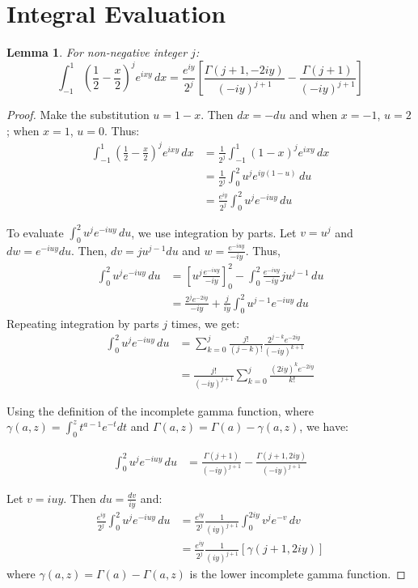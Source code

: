 \documentclass[12pt]{article}
\newtheorem{lemma}[theorem]{Lemma}
\begin{document}
\section*{Integral Evaluation}

\begin{lemma}
For non-negative integer $j$:
\[
\int_{-1}^1 \left(\frac{1}{2} - \frac{x}{2}\right)^j e^{ixy} \, dx = 
\frac{e^{iy}}{2^j} \left[\frac{\Gamma(j+1,-2iy)}{(-iy)^{j+1}} - \frac{\Gamma(j+1)}{(-iy)^{j+1}}\right]
\]
\end{lemma}

\begin{proof}
Make the substitution $u = 1-x$. Then $dx = -du$ and when $x = -1$, $u = 2$; when $x = 1$, $u = 0$. Thus:
\begin{align*}
\int_{-1}^1 \left(\frac{1}{2} - \frac{x}{2}\right)^j e^{ixy} \, dx 
&= \frac{1}{2^j} \int_{-1}^1 (1-x)^j e^{ixy} \, dx \\
&= \frac{1}{2^j} \int_0^2 u^j e^{iy(1-u)} \, du \\
&= \frac{e^{iy}}{2^j} \int_0^2 u^j e^{-iuy} \, du
\end{align*}

To evaluate \( \int_0^2 u^j e^{-iuy} \, du \), we use integration by parts. Let \(v = u^j\) and \(dw = e^{-iuy} du\). Then, \(dv = j u^{j-1} du\) and \(w = \frac{e^{-iuy}}{-iy}\). Thus,
\begin{align*}
\int_0^2 u^j e^{-iuy} \, du &= \left[ u^j \frac{e^{-iuy}}{-iy} \right]_0^2 - \int_0^2 \frac{e^{-iuy}}{-iy} j u^{j-1} \, du \\
&= \frac{2^j e^{-2iy}}{-iy} + \frac{j}{iy} \int_0^2 u^{j-1} e^{-iuy} \, du
\end{align*}
Repeating integration by parts \(j\) times, we get:
\begin{align*}
\int_0^2 u^j e^{-iuy} \, du &= \sum_{k=0}^{j} \frac{j!}{(j-k)!} \frac{2^{j-k} e^{-2iy}}{(-iy)^{k+1}} \\
&= \frac{j!}{(-iy)^{j+1}} \sum_{k=0}^{j} \frac{(2iy)^{k} e^{-2iy}}{k!}
\end{align*}

Using the definition of the incomplete gamma function, where \(\gamma(a, z) = \int_0^z t^{a-1} e^{-t} dt\) and \(\Gamma(a, z) = \Gamma(a) - \gamma(a, z)\), we have:

\begin{align*}
\int_0^2 u^j e^{-iuy} \, du &=  \frac{\Gamma(j+1)}{(-iy)^{j+1}} - \frac{\Gamma(j+1,2iy)}{(-iy)^{j+1}}
\end{align*}

Let $v = iuy$. Then $du = \frac{dv}{iy}$ and:
\begin{align*}
\frac{e^{iy}}{2^j} \int_0^2 u^j e^{-iuy} \, du 
&= \frac{e^{iy}}{2^j} \frac{1}{(iy)^{j+1}} \int_0^{2iy} v^j e^{-v} \, dv \\
&= \frac{e^{iy}}{2^j} \frac{1}{(iy)^{j+1}} [\gamma(j+1,2iy)]
\end{align*}
where $\gamma(a,z) = \Gamma(a) - \Gamma(a,z)$ is the lower incomplete gamma function.
\end{proof}
\end{document}

